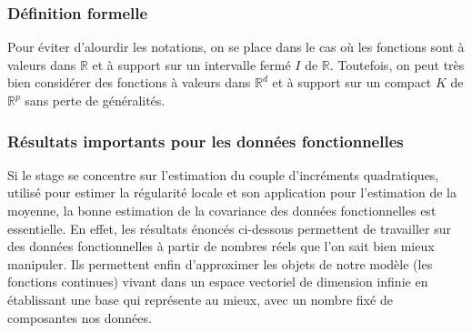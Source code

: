 \subsubsection{Définition formelle}

Pour éviter d'alourdir les notations, on se place dans le cas où les fonctions sont à valeurs dans $\mathds R$ et à support sur un intervalle fermé $I$ de $\mathds R$. Toutefois, on peut très bien considérer des fonctions à valeurs dans $\mathds R^d$ et à support sur un compact $K$ de $\mathds R^p$ sans perte de généralités.



\subsubsection{Résultats importants pour les données fonctionnelles}


Si le stage se concentre sur l'estimation du couple d'incréments quadratiques, utilisé pour estimer la régularité locale et son application pour l'estimation de la moyenne, la  bonne estimation de la covariance des données fonctionnelles est essentielle. En effet, les résultats énoncés ci-dessous permettent de travailler sur des données fonctionnelles à partir de nombres réels que l'on sait bien mieux manipuler. Ils permettent enfin d'approximer les objets de notre modèle (les fonctions continues) vivant dans un espace vectoriel de dimension infinie en établissant une \og base \fg qui représente au mieux, avec un nombre fixé de composantes nos données.

\bigskip

